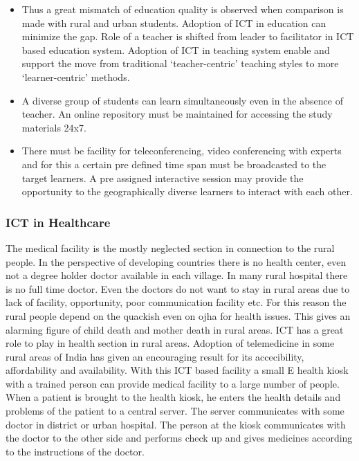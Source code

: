 \documentclass[12pt]{homework}
\begin{document}
\begin{itemize}

\item Thus a great mismatch of education quality is observed when comparison is made with rural and urban students. Adoption of ICT in education can minimize the gap. Role of a teacher is shifted from leader to facilitator in ICT based education system. Adoption of ICT in teaching system enable and support the move from traditional `teacher-centric' teaching styles to more `learner-centric' methods. \\

\item A diverse group of students can learn simultaneously even in the absence of teacher. An online repository must be maintained for accessing the study materials 24x7. \\

\item There must be facility for teleconferencing, video conferencing with experts and for this a certain pre defined time span must be broadcasted to the target learners. A pre assigned interactive session may provide the opportunity to the geographically diverse learners to interact with each other.\\
\end{itemize}

\subsubsection{ ICT in Healthcare}
The medical facility is the mostly neglected section in connection to the rural people. In the perspective of developing countries there is no health center, even not a degree holder doctor available in each village. In many rural hospital there is no full time doctor. Even the doctors do not want to stay in rural areas due to lack of facility, opportunity, poor communication facility etc. For this reason the rural people depend on the quackish even on ojha for health issues. This gives an alarming figure of child death and mother death in rural areas. ICT has a great role to play in health section in rural areas. Adoption of telemedicine in some rural areas of India has given an encouraging result for its accecibility, affordability and availability. With this ICT based facility a small E health kiosk with a trained person can provide medical facility to a large number of people. When a patient is brought to the health kiosk, he enters the health details and problems of the patient to a central server. The server communicates with some doctor in district or urban hospital. The person at the kiosk communicates with the doctor to the other side and performs check up and gives medicines according to the instructions of the doctor.\\
\end{document}
